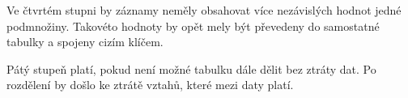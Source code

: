 Ve čtvrtém stupni by záznamy neměly obsahovat více nezávislých hodnot jedné podmnožiny. 
Takovéto hodnoty by opět mely být převedeny do samostatné tabulky a spojeny cizím klíčem.

Pátý stupeň platí, pokud není možné tabulku dále dělit bez ztráty dat. Po 
rozdělení by došlo ke ztrátě vztahů, které mezi daty platí. \cite{normalizace}























